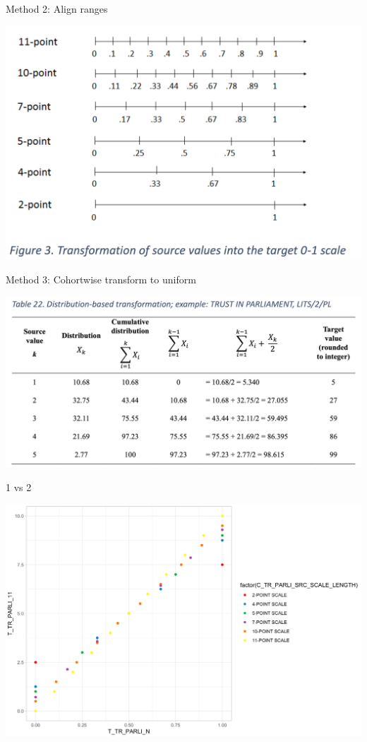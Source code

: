\documentclass[ignorenonframetext,aspectratio=43]{beamer}
\begin{document}
\begin{frame}{Method 2: Align ranges}
\protect\hypertarget{method-2-align-ranges}{}

\includegraphics{figures/figure3.png}

\end{frame}

\begin{frame}{Method 3: Cohortwise transform to uniform}
\protect\hypertarget{method-3-cohortwise-transform-to-uniform}{}

\includegraphics{figures/figure22.png}

\end{frame}

\begin{frame}{1 vs 2}
\protect\hypertarget{vs-2}{}

\includegraphics{figures/scatter1.png}

\end{frame}
\end{document}
